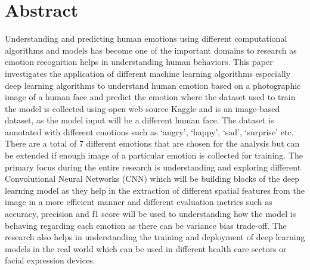 \chapter*{\center \Large  Abstract}

Understanding and predicting human emotions using different computational algorithms and models has become one of the important domains to research as emotion recognition helps in understanding human behaviors. This paper investigates the application of different machine learning algorithms especially deep learning algorithms to understand human emotion based on a photographic image of a human face and predict the emotion where the dataset used to train the model is collected using open web source Kaggle and is an image-based dataset, as the model input will be a different human face. The dataset is annotated with different emotions such as ‘angry’, ‘happy’, ‘sad’, ‘surprise’ etc. There are a total of 7 different emotions that are chosen for the analysis but can be extended if enough image of a particular emotion is collected for training. The primary focus during the entire research is understanding and exploring different Convolutional Neural Networks (CNN) which will be building blocks of the deep learning model as they help in the extraction of different spatial features from the image in a more efficient manner and different evaluation metrics such as accuracy, precision and f1 score will be used to understanding how the model is behaving regarding each emotion as there can be variance bias trade-off. The research also helps in understanding the training and deployment of deep learning models in the real world which can be used in different health care sectors or facial expression devices.



